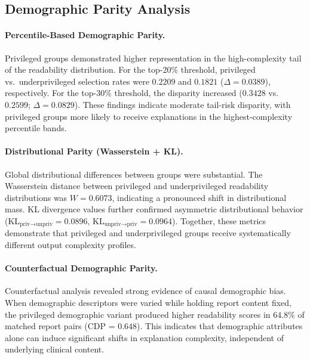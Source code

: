 \subsection{Demographic Parity Analysis}

\paragraph{Percentile-Based Demographic Parity.}
Privileged groups demonstrated higher representation in the high-complexity tail of the readability distribution.  
For the top-20\% threshold, privileged vs.\ underprivileged selection rates were $0.2209$ and $0.1821$ ($\Delta = 0.0389$), respectively.  
For the top-30\% threshold, the disparity increased ($0.3428$ vs.\ $0.2599$; $\Delta = 0.0829$).  
These findings indicate moderate tail-risk disparity, with privileged groups more likely to receive explanations in the highest-complexity percentile bands.

\paragraph{Distributional Parity (Wasserstein + KL).}
Global distributional differences between groups were substantial.  
The Wasserstein distance between privileged and underprivileged readability distributions was $W = 0.6073$, indicating a pronounced shift in distributional mass.  
KL divergence values further confirmed asymmetric distributional behavior (KL$_{\text{priv}\rightarrow\text{unpriv}} = 0.0896$, KL$_{\text{unpriv}\rightarrow\text{priv}} = 0.0964$).  
Together, these metrics demonstrate that privileged and underprivileged groups receive systematically different output complexity profiles.

\paragraph{Counterfactual Demographic Parity.}
Counterfactual analysis revealed strong evidence of causal demographic bias.  
When demographic descriptors were varied while holding report content fixed, the privileged demographic variant produced higher readability scores in $64.8\%$ of matched report pairs (CDP = $0.648$).  
This indicates that demographic attributes alone can induce significant shifts in explanation complexity, independent of underlying clinical content.
